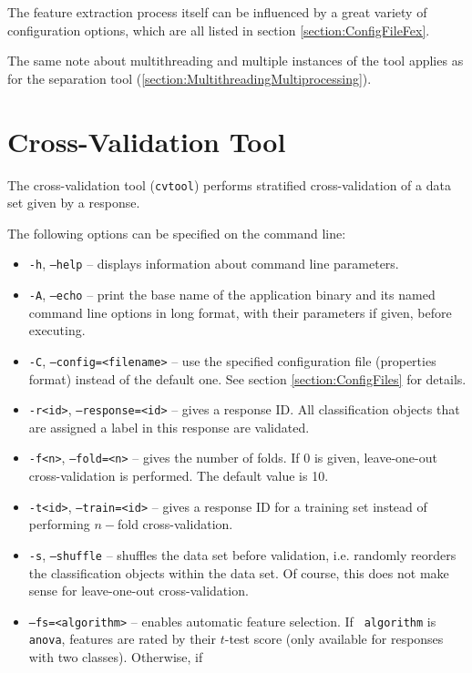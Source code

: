 The feature extraction process itself can be influenced by a great variety of
configuration options, which are all listed in section
\ref{section:ConfigFileFex}.

The same note about multithreading and multiple instances of the tool applies as
for the separation tool (\ref{section:MultithreadingMultiprocessing}).


\section{Cross-Validation Tool}

The cross-validation tool ({\tt cvtool}) performs stratified cross-validation of
a data set given by a response.

\noindent The following options can be specified on the command line:
\begin{itemize}
  \item {\tt -h}, {\tt --help} -- displays information about command line
    parameters.
  \item {\tt -A}, {\tt --echo} -- print the base name of the application binary
    and its named command line options in long format, with their parameters if 
    given, before executing.
  \item {\tt -C}, {\tt --config=<filename>} -- use the specified configuration
    file (properties format) instead of the default one. See section 
    \ref{section:ConfigFiles} for details.
  \item {\tt -r<id>}, {\tt --response=<id>} -- gives a response ID. All
    classification objects that are assigned a label in this response are
    validated.
  \item {\tt -f<n>}, {\tt --fold=<n>} -- gives the number of folds. If 0 is
    given, leave-one-out cross-validation is performed. The default value is
    10.
  \item {\tt -t<id>}, {\tt --train=<id>} -- gives a response ID for a
    training set instead of performing $n-$fold cross-validation.
  \item {\tt -s}, {\tt --shuffle} -- shuffles the data set before validation,
    i.e. randomly reorders the classification objects within the data set. Of
    course, this does not make sense for leave-one-out cross-validation.
  \item {\tt --fs=<algorithm>} -- enables automatic feature selection. If {\tt
      algorithm} is {\tt anova}, features are rated by their $t$-test score
    (only available for responses with two classes).  Otherwise, if {\tt
}
\end{itemize}

